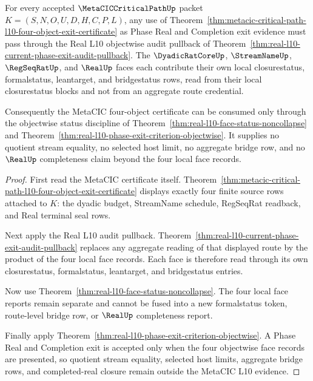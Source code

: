 \begin{theorem}
\label{thm:metacic-critical-path-l10-status-bridge-obligation}
For every accepted $\MetaCICCriticalPathUp$ packet $K=(S,N,O,U,D,H,C,P,L)$, any use of Theorem~\ref{thm:metacic-critical-path-l10-four-object-exit-certificate} as Phase Real and Completion exit evidence must pass through the Real L10 objectwise audit pullback of Theorem~\ref{thm:real-l10-current-phase-exit-audit-pullback}. The $\DyadicRatCoreUp$, $\StreamNameUp$, $\RegSeqRatUp$, and $\RealUp$ faces each contribute their own local closurestatus, formalstatus, leantarget, and bridgestatus rows, read from their local closurestatus blocks and not from an aggregate route credential.

Consequently the MetaCIC four-object certificate can be consumed only through the objectwise status discipline of Theorem~\ref{thm:real-l10-face-status-noncollapse} and Theorem~\ref{thm:real-l10-phase-exit-criterion-objectwise}. It supplies no quotient stream equality, no selected host limit, no aggregate bridge row, and no $\RealUp$ completeness claim beyond the four local face records.
\end{theorem}
\begin{proof}
First read the MetaCIC certificate itself. Theorem~\ref{thm:metacic-critical-path-l10-four-object-exit-certificate} displays exactly four finite source rows attached to $K$: the dyadic budget, StreamName schedule, RegSeqRat readback, and Real terminal seal rows.

Next apply the Real L10 audit pullback. Theorem~\ref{thm:real-l10-current-phase-exit-audit-pullback} replaces any aggregate reading of that displayed route by the product of the four local face records. Each face is therefore read through its own closurestatus, formalstatus, leantarget, and bridgestatus entries.

Now use Theorem~\ref{thm:real-l10-face-status-noncollapse}. The four local face reports remain separate and cannot be fused into a new formalstatus token, route-level bridge row, or $\RealUp$ completeness report.

Finally apply Theorem~\ref{thm:real-l10-phase-exit-criterion-objectwise}. A Phase Real and Completion exit is accepted only when the four objectwise face records are presented, so quotient stream equality, selected host limits, aggregate bridge rows, and completed-real closure remain outside the MetaCIC L10 evidence.
\end{proof}

